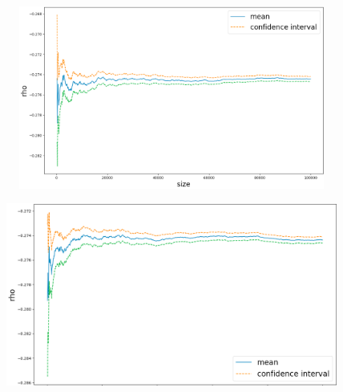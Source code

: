 \documentclass {article}
\begin{document}
			\newpage

			\begin{center}
				\begin{figure}[!h]
					\centering
				            \includegraphics[width=15cm, height=6cm]{bestOfAsianOptionFiniteDifferenceMethodRho.png}
				\end{figure}
			\end{center}
			
			
			\begin{center}
				\begin{figure}[!h]
					\centering
				            \includegraphics[width=15cm, height=6cm]{bestOfAsianOptionTangentModeRho.png}
				\end{figure}
			\end{center}
\end{document}
